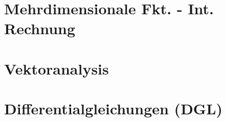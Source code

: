 \documentclass[8pt]{mpscheatsheet}
\begin{document}
     \section{Mehrdimensionale Fkt. - Int. Rechnung}
         
         
         
         
         
         
         
         
         
         
     \section{Vektoranalysis}
         
         
         
         
         
     \section{Differentialgleichungen (DGL)}
         
         
         
         
         
         
         
         
         
         
         
\end{document}
